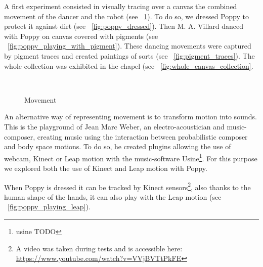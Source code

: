 A first experiment consisted in visually tracing over a canvas the combined movement of the dancer and the robot (see \figurename~\ref{fig:residency_canvas}). To do so, we dressed Poppy to protect it against dirt (see \figurename~\ref{fig:poppy_dressed}). Then M. A. Villard danced with Poppy on canvas covered with pigments (see \figurename~\ref{fig:poppy_playing_with_pigment}). These dancing movements were captured by pigment traces and created paintings of sorts (see \figurename~\ref{fig:pigment_traces}). The whole collection was exhibited in the chapel (see \figurename~\ref{fig:whole_canvas_collection}.

\begin{figure}[tb]
\centering
    \hfil
    \\
    \hfil
    \caption{Movement }
    \label{fig:residency_canvas}
\end{figure}

An alternative way of representing movement is to transform motion into sounds. This is the playground of Jean Marc Weber, an electro-acoustician and music-composer, creating music using the interaction between probabilistic composer and body space motions. To do so, he created plugins allowing the use of webcam, Kinect or Leap motion with the music-software Usine\footnote{usine TODO}. For this purpose we explored both the use of Kinect and Leap motion with Poppy.

When Poppy is dressed it can be tracked by Kinect sensors\footnote{A video was taken during tests and is accessible here: \url{https://www.youtube.com/watch?v=VVjBVTtPkFE}}, also thanks to the human shape of the hands, it can also play with the Leap motion (see \figurename~\ref{fig:poppy_playing_leap}).

\begin{figure}[tb]
\centering
    \hfil
    \caption{}

\end{figure}

